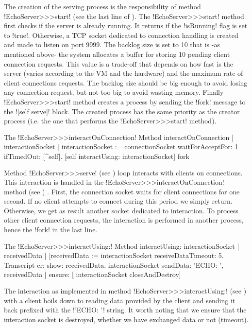 \documentclass[a4paper,10pt,twoside]{book}
\begin{document}
The creation of the serving process is the responsibility of method \ct!EchoServer>>>start! (see the last line of ).
The \ct!EchoServer>>>start! method first checks if the server is already running.
It returns if the \ct!isRunning! flag is set to \ct!true!.
Otherwise, a TCP socket dedicated to connection handling is created and made to listen on port 9999.
The backlog size is set to 10 that is -as mentioned above- the system allocates a buffer for storing 10 pending client connection requests.
This value is a trade-off that depends on how fast is the server (varies according to the VM and the hardware) and the maximum rate of client connections requests.
The backlog size should be big enough to avoid losing any connection request, but not too big to avoid wasting memory.
Finally \ct!EchoServer>>>start! method creates a process by sending the \ct!fork! message to the \ct![self serve]! block.
The created process has the same priority as the creator process (i.e. the one that performs the \ct!EchoServer>>>start! method).


\begin{method}{The \ct!EchoServer>>>interactOnConnection! Method}
interactOnConnection
	| interactionSocket |
	interactionSocket := connectionSocket waitForAcceptFor: 1 ifTimedOut: [^self].
	[self interactUsing: interactionSocket] fork
\end{method}

Method \ct!EchoServer>>>serve! (see ) loop interacts with clients on connections.
This interaction is handled in the \ct!EchoServer>>>interactOnConnection! method (see ) .
First, the connection socket waits for client connections for one second.
If no client attempts to connect during this period we simply return.
Otherwise, we get as result another socket dedicated to interaction.
To process other client connection requests, the interaction is performed in another process, hence the \ct!fork! in the last line.

\begin{method}{The \ct!EchoServer>>>interactUsing:! Method}
interactUsing: interactionSocket
	| receivedData |
	[receivedData := interactionSocket receiveDataTimeout: 5.
	 Transcript cr; show: receivedData.
	 interactionSocket sendData: 'ECHO: ', receivedData
	] ensure: [
	 interactionSocket closeAndDestroy]
\end{method}
\alex{I would move the closing ']' after 'receivedData', with a blank character before the square bracket}
The interaction as implemented in method \ct!EchoServer>>>interactUsing:! (see ) with a client boils down to reading data provided by the client and sending it back prefixed with the \ct!'ECHO: '! string.
It worth noting that we ensure that the interaction socket is destroyed, whether we have exchanged data or not (timeout).
\end{document}
